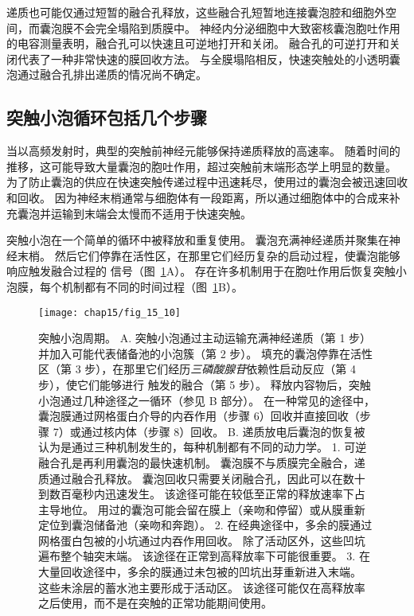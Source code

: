 递质也可能仅通过短暂的融合孔释放，这些融合孔短暂地连接囊泡腔和细胞外空间，而囊泡膜不会完全塌陷到质膜中。
神经内分泌细胞中大致密核囊泡胞吐作用的电容测量表明，融合孔可以快速且可逆地打开和关闭。
融合孔的可逆打开和关闭代表了一种非常快速的膜回收方法。
与全膜塌陷相反，快速突触处的小透明囊泡通过融合孔排出递质的情况尚不确定。



\subsection{突触小泡循环包括几个步骤}

当以高频发射时，典型的突触前神经元能够保持递质释放的高速率。
随着时间的推移，这可能导致大量囊泡的胞吐作用，超过突触前末端形态学上明显的数量。
为了防止囊泡的供应在快速突触传递过程中迅速耗尽，使用过的囊泡会被迅速回收和回收。
因为神经末梢通常与细胞体有一段距离，所以通过细胞体中的合成来补充囊泡并运输到末端会太慢而不适用于快速突触。


突触小泡在一个简单的循环中被释放和重复使用。
囊泡充满神经递质并聚集在神经末梢。
然后它们停靠在活性区，在那里它们经历复杂的启动过程，使囊泡能够响应触发融合过程的  信号（图~\ref{fig:15_10}A）。
存在许多机制用于在胞吐作用后恢复突触小泡膜，每个机制都有不同的时间过程（图~\ref{fig:15_10}B）。


\begin{figure}[htbp]
	\centering
	\texttt{[image: chap15/fig\_15\_10]}
	\caption{突触小泡周期。
		A. 突触小泡通过主动运输充满神经递质（第 1 步）并加入可能代表储备池的小泡簇（第 2 步）。
		填充的囊泡停靠在活性区（第 3 步），在那里它们经历\textit{三磷酸腺苷}依赖性启动反应（第 4 步），使它们能够进行  触发的融合（第 5 步）。
		释放内容物后，突触小泡通过几种途径之一循环（参见 B 部分）。
		在一种常见的途径中，囊泡膜通过网格蛋白介导的内吞作用（步骤 6）回收并直接回收（步骤 7）或通过核内体（步骤 8）回收。
		B. 递质放电后囊泡的恢复被认为是通过三种机制发生的，每种机制都有不同的动力学。
		1. 可逆融合孔是再利用囊泡的最快速机制。
		囊泡膜不与质膜完全融合，递质通过融合孔释放。
		囊泡回收只需要关闭融合孔，因此可以在数十到数百毫秒内迅速发生。
		该途径可能在较低至正常的释放速率下占主导地位。
		用过的囊泡可能会留在膜上（亲吻和停留）或从膜重新定位到囊泡储备池（亲吻和奔跑）。
		2. 在经典途径中，多余的膜通过网格蛋白包被的小坑通过内吞作用回收。
		除了活动区外，这些凹坑遍布整个轴突末端。
		该途径在正常到高释放率下可能很重要。
		3. 在大量回收途径中，多余的膜通过未包被的凹坑出芽重新进入末端。
		这些未涂层的蓄水池主要形成于活动区。
		该途径可能仅在高释放率之后使用，而不是在突触的正常功能期间使用\cite{schweizer1995vesicle}。}
	\label{fig:15_10}
\end{figure}


